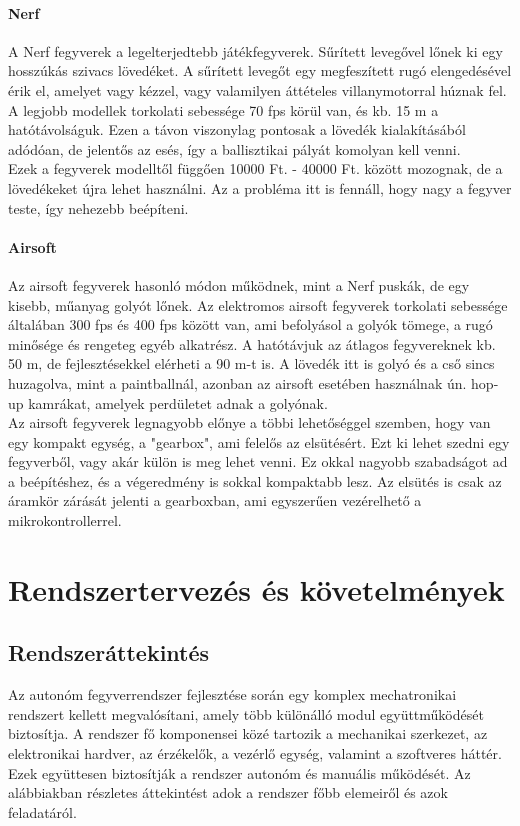 \documentclass[12pt,a4paper]{article}
\begin{document}
\paragraph{Nerf}

A Nerf fegyverek a legelterjedtebb játékfegyverek. Sűrített levegővel lőnek ki egy hosszúkás szivacs lövedéket. A sűrített levegőt egy megfeszített rugó elengedésével érik el, amelyet vagy kézzel, vagy valamilyen áttételes villanymotorral húznak fel. A legjobb modellek torkolati sebessége 70 fps körül van, és kb. 15 m a hatótávolságuk. Ezen a távon viszonylag pontosak a lövedék kialakításából adódóan, de jelentős az esés, így a ballisztikai pályát komolyan kell venni. \\

Ezek a fegyverek modelltől függően 10000 Ft. - 40000 Ft. között mozognak, de a lövedékeket újra lehet használni. Az a probléma itt is fennáll, hogy nagy a fegyver teste, így nehezebb beépíteni. 

\paragraph{Airsoft}

Az airsoft fegyverek hasonló módon működnek, mint a Nerf puskák, de egy kisebb, műanyag golyót lőnek. Az elektromos airsoft fegyverek torkolati sebessége általában 300 fps és 400 fps között van, ami befolyásol a golyók tömege, a rugó minősége és rengeteg egyéb alkatrész. A hatótávjuk az átlagos fegyvereknek kb. 50 m, de fejlesztésekkel elérheti a 90 m-t is. A lövedék itt is golyó és a cső sincs huzagolva, mint a paintballnál, azonban az airsoft esetében használnak ún. hop-up kamrákat, amelyek perdületet adnak a golyónak.\\

Az airsoft fegyverek legnagyobb előnye a többi lehetőséggel szemben, hogy van egy kompakt egység, a "gearbox", ami felelős az elsütésért. Ezt ki lehet szedni egy fegyverből, vagy akár külön is meg lehet venni. Ez okkal nagyobb szabadságot ad a beépítéshez, és a végeredmény is sokkal kompaktabb lesz. Az elsütés is csak az áramkör zárását jelenti a gearboxban, ami egyszerűen vezérelhető a mikrokontrollerrel.
\pagebreak

\section{Rendszertervezés és követelmények}
\subsection{Rendszeráttekintés}
Az autonóm fegyverrendszer fejlesztése során egy komplex mechatronikai rendszert kellett megvalósítani, amely több különálló modul együttműködését biztosítja. A rendszer fő komponensei közé tartozik a mechanikai szerkezet, az elektronikai hardver, az érzékelők, a vezérlő egység, valamint a szoftveres háttér. Ezek együttesen biztosítják a rendszer autonóm és manuális működését. Az alábbiakban részletes áttekintést adok a rendszer főbb elemeiről és azok feladatáról.
\end{document}
